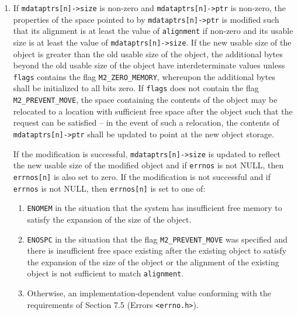 \documentclass[wd]{isov2}
\begin{document}
{\begin{enumerate}
\begin{enumerate}
If the allocation is successful, \texttt{mdataptrs[n]->ptr} is set to point at the allocated space, \texttt{mdataptrs[n]->size} is set to the usable size of the object and if \texttt{errnos} is not NULL, then \texttt{errnos[n]} is also set to zero. If the allocation is not successful and if \texttt{errnos} is not NULL, then \texttt{errnos[n]} is set to one of:
\begin{enumerate}
\item \texttt{ENOMEM} in the situation that the system has insufficient free memory to satisfy the allocation of the object.
\item Otherwise, an implementation-dependent value conforming with the requirements of Section 7.5 (Errors \texttt{<errno.h>}).
\end{enumerate}

\item If \texttt{mdataptrs[n]->size} is non-zero and \texttt{mdataptrs[n]->ptr} is non-zero, the properties of the space pointed to by \texttt{mdataptrs[n]->ptr} is modified such that its alignment is at least the value of \texttt{alignment} if non-zero and its usable size is at least the value of \texttt{mdataptrs[n]->size}. If the new usable size of the object is greater than the old usable size of the object, the additional bytes beyond the old usable size of the object have interdeterminate values unless \texttt{flags} contains the flag \texttt{M2\_ZERO\_MEMORY}, whereupon the additional bytes shall be initialized to all bits zero. If \texttt{flags} does not contain the flag \texttt{M2\_PREVENT\_MOVE}, the space containing the contents of the object may be relocated to a location with sufficient free space after the object such that the request can be satisfied -- in the event of such a relocation, the contents of \texttt{mdataptrs[n]->ptr} shall be updated to point at the new object storage.

If the modification is successful, \texttt{mdataptrs[n]->size} is updated to reflect the new usable size of the modified object and if \texttt{errnos} is not NULL, then \texttt{errnos[n]} is also set to zero. If the modification is not successful and if \texttt{errnos} is not NULL, then \texttt{errnos[n]} is set to one of:
\begin{enumerate}
\renewcommand{\theenumii}{\alph{enumii}}
\item \texttt{ENOMEM} in the situation that the system has insufficient free memory to satisfy the expansion of the size of the object.
\item \texttt{ENOSPC} in the situation that the flag \texttt{M2\_PREVENT\_MOVE} was specified and there is insufficient free space existing after the existing object to satisfy the expansion of the size of the object or the alignment of the existing object is not sufficient to match \texttt{alignment}.
\item Otherwise, an implementation-dependent value conforming with the requirements of Section 7.5 (Errors \texttt{<errno.h>}).
\end{enumerate}


\end{enumerate}
\end{enumerate}}
\end{document}

